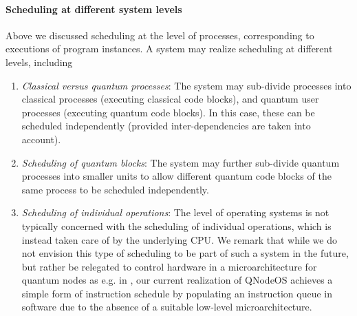 \paragraph{Scheduling at different system levels}

Above we discussed scheduling at the level of processes, corresponding to executions of program instances. A system may realize scheduling at different levels, including
%
\begin{enumerate}
\item \emph{Classical versus quantum processes}: The system may sub-divide processes into classical processes (executing classical code blocks), and quantum user processes (executing quantum code blocks). In this case, these can be scheduled independently (provided inter-dependencies are taken into account). 
\item \emph{Scheduling of quantum blocks}: The system may further sub-divide quantum processes into smaller units to allow different quantum code blocks of the same process to be scheduled independently.
\item \emph{Scheduling of individual operations}: The level of operating systems is not typically concerned with the scheduling of individual operations, which is instead taken care of by the underlying \ac{CPU}. We remark that while we do not envision this type of scheduling to be part of such a system in the future, but rather be relegated to control hardware in a microarchitecture for quantum nodes as e.g. in 
\textcite{fu_2017_microarch}, our current realization of \ac{QNodeOS} achieves a simple form of instruction schedule by populating an instruction queue in software due to the absence of a suitable low-level microarchitecture.
\end{enumerate}